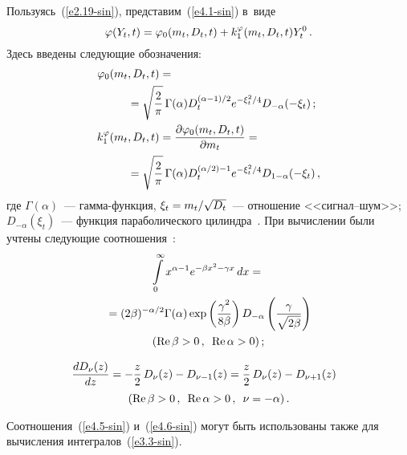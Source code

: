 \begin{multicols}{2}
Пользуясь~(\ref{e2.19-sin}), представим~(\ref{e4.1-sin}) в~виде
\begin{equation*}
\varphi(Y_t, t) = \varphi_0 (m_t, D_t, t) + k_1^\varphi(m_t, D_t, t) Y_t^0\,.
\end{equation*}
Здесь введены следующие обозначения:
\begin{align}
\vrp_0(m_t, D_t, t) &={}\notag\\
&\hspace*{-10mm}{}=\sqrt{\fr{2}{\pi}}\,\Gamma(\alpha)
    D_t^{(\alpha-1)/2} e^{-\xi_t^2/4} D_{-\alpha} (-\xi_t)\,;\label{e4.3-sin}\\
k_1^\vrp (m_t, D_t, t) &= \fr{\prt \vrp_0(m_t, D_t, t)}{\prt m_t}={}\notag\\
&\hspace*{-10mm}{}=
\sqrt{\fr{2}{\pi}}\,\Gamma(\alpha) D_t^{(\alpha/2)-1} e^{-\xi_t^2/4} D_{1-\alpha}
(-\xi_t) \,,\label{e4.4-sin}
\end{align}
где  $\Gamma(\alpha)$~--- гамма-функ\-ция,  $\xi_t \hm= m_t/\sqrt{D_t}$~---
отношение <<сигнал--шум>>; $D_{-\alpha} (\xi_t)$~--- функция параболического
цилиндра~\cite{9-sin}.
При вычислении были учтены следующие соотношения~\cite{9-sin, 8-sin}:
   \begin{multline}
   \int\limits\limits_0^\infty x^{\alpha-1} e^{-\beta x^2 - \gamma x}\,dx ={}\\
   {}= (2\beta)^{-\alpha/2} \Gamma(\alpha) \exp
   \left(\displaystyle\frac{\displaystyle \gamma^2\mathstrut}{\displaystyle 8\beta\mathstrut}\right) D_{-\alpha}
   \left(\displaystyle\frac{\displaystyle \gamma\mathstrut}{\displaystyle \sqrt{2\beta}\mathstrut}\right)\\
   (\mathrm{Re}\,\beta>0\,,\enskip \mathrm{Re}\,\alpha >0)\,;\label{e4.5-sin}
   \end{multline}

   \vspace*{-12pt}

   \noindent
   \begin{multline}
\hspace*{-3mm}\fr{dD_{\nu}(z)}{dz} =
   -\fr{z}{2}\,D_{\nu} (z) - D_{\nu-1} (z) = \fr{z}{2}\, D_{\nu} (z) -
   D_{\nu+1} (z) \\
(\mathrm{Re}\, \beta>0\,,\enskip \mathrm{Re}\,\alpha>0\,,\enskip \nu=-\alpha)\,.
\label{e4.6-sin}
\end{multline}

Соотношения~(\ref{e4.5-sin}) и~(\ref{e4.6-sin}) могут быть использованы
 также для вычисления интегралов~(\ref{e3.3-sin}).


\end{multicols}
